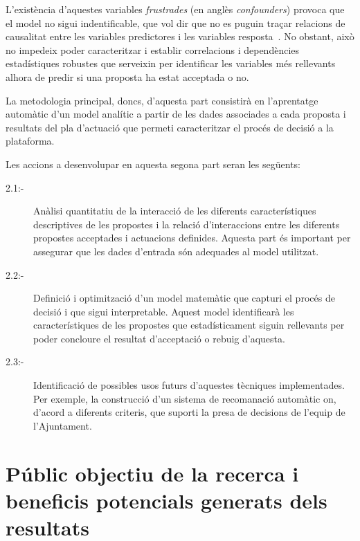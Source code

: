 \documentclass[final,10pt]{article}
\begin{document}
L'exist\`encia d'aquestes variables \emph{frustrades} (en angl\`es \emph{confounders}) provoca que el model no sigui indentificable, que vol dir que no es puguin tra\c{c}ar relacions de causalitat entre les variables predictores i les variables resposta~\cite{Pearl}. No obstant, 
aix\`o no impedeix poder caracteritzar i establir correlacions i depend\`encies estad\'istiques robustes que 
serveixin per identificar les variables m\'es rellevants alhora de predir si una proposta ha estat acceptada o no.

La metodologia principal, doncs, d'aquesta part consistir\`a en l'aprentatge autom\`atic d'un model anal\'itic a partir de les dades associades a cada proposta i resultats del pla d'actuaci\'o que permeti caracteritzar el proc\'es de decisi\'o a la plataforma.

Les accions a desenvolupar en aquesta segona part seran les seg\"uents:
\begin{description}
\item[2.1:-] 
An\`alisi quantitatiu de la interacci\'o de les diferents caracter\'istiques descriptives de les propostes i la 
relaci\'o d'interaccions entre les diferents propostes acceptades i actuacions definides.
Aquesta part \'es important per assegurar que les dades d'entrada s\'on adequades al model utilitzat.
\item[2.2:-]
Definici\'o i optimitzaci\'o d'un model matem\`atic que capturi el proc\'es de decisi\'o i que sigui interpretable.
Aquest model identificar\`a les caracter\'istiques de les propostes que estad\'isticament siguin rellevants per poder concloure el resultat d'acceptaci\'o o rebuig d'aquesta.
\item[2.3:-]
Identificaci\'o de possibles usos futurs d'aquestes t\`ecniques implementades.
Per exemple, la construcci\'o d'un sistema de recomanaci\'o autom\`atic on, d'acord a diferents criteris, 
que suporti la presa de decisions de l'equip de l'Ajuntament.
\end{description}

%
%
%
\section{P\'ublic objectiu de la recerca i beneficis potencials generats dels resultats}
\end{document}
